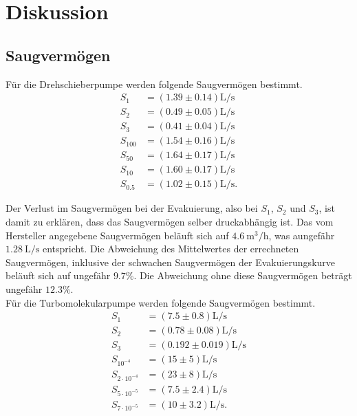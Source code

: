 \section{Diskussion}
\label{sec:Diskussion}

\subsection{Saugvermögen}

Für die Drehschieberpumpe werden folgende Saugvermögen bestimmt.
\begin{align}
    S_1 &= (\num{1.39} \pm \num{0.14}) \si{\liter\per\second} \\
    S_2 &= (\num{0.49} \pm \num{0.05}) \si{\liter\per\second} \\
    S_3 &= (\num{0.41} \pm \num{0.04}) \si{\liter\per\second} \\
    S_{100} &= (\num{1.54} \pm \num{0.16}) \si{\liter\per\second} \\
    S_{50} &= (\num{1.64} \pm \num{0.17}) \si{\liter\per\second} \\
    S_{10} &= (\num{1.60} \pm \num{0.17}) \si{\liter\per\second} \\
    S_{\num{0.5}} &= (\num{1.02} \pm \num{0.15}) \si{\liter\per\second}.
\end{align}

Der Verlust im Saugvermögen bei der Evakuierung, also bei $S_1$, $S_2$ und $S_3$, ist damit zu erklären, dass das Saugvermögen selber druckabhängig ist.
Das vom Hersteller angegebene Saugvermögen beläuft sich auf $\SI{4.6}{\meter\cubed\per\hour}$, was aungefähr $\SI{1.28}{\liter\per\second}$ entspricht.
Die Abweichung des Mittelwertes der errechneten Saugvermögen,  inklusive der schwachen Saugvermögen der Evakuierungskurve beläuft sich auf ungefähr $\num{9.7}\%$.
Die Abweichung ohne diese Saugvermögen beträgt ungefähr $\num{12.3}\%$. \\


Für die Turbomolekularpumpe werden folgende Saugvermögen bestimmt.
\begin{align}
    S_1 &= (\num{7.5} \pm \num{0.8}) \si{\liter\per\second} \\
    S_2 &= (\num{0.78} \pm \num{0.08}) \si{\liter\per\second} \\
    S_3 &= (\num{0.192} \pm \num{0.019}) \si{\liter\per\second} \\
    S_{10^{-4}} &= (\num{15} \pm \num{5}) \si{\liter\per\second} \\
    S_{2 \cdot 10^{-4}} &= (\num{23} \pm \num{8}) \si{\liter\per\second} \\
    S_{5 \cdot 10^{-5}} &= (\num{7.5} \pm \num{2.4}) \si{\liter\per\second}\\
    S_{7 \cdot 10^{-5}} &= (\num{10} \pm \num{3.2}) \si{\liter\per\second}.
\end{align}

